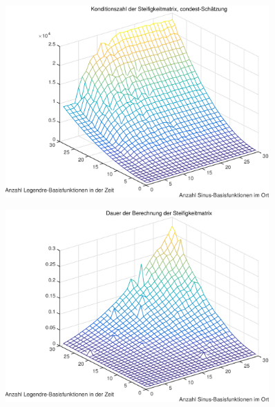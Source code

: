 \begin{figure}[tb]
    \begin{center}
        \includegraphics[width=0.9\textwidth]{figures/oned/condest.pdf}
    \end{center}
\end{figure}

\begin{figure}[tb]
    \begin{center}
        \includegraphics[width=0.9\textwidth]{figures/oned/times.pdf}
    \end{center}
\end{figure}

